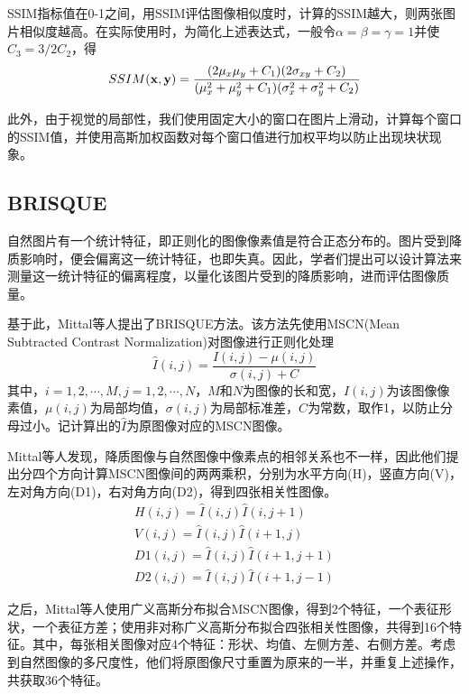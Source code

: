 \documentclass[a4paper, 12pt, oneside]{report}
\begin{document}
{SSIM指标值在0-1之间，用SSIM评估图像相似度时，计算的SSIM越大，则两张图片相似度越高。在实际使用时，为简化上述表达式，一般令$\alpha = \beta = \gamma = 1$并使$C_3 = 3/2 C_2$，得
\begin{equation}
SSIM({\bf x, y}) = \frac{(2\mu_x\mu_y + C_1)(2\sigma_{xy}+ C_2)}{(\mu_x^2 + \mu_y^2 + C_1)(\sigma_x^2 + \sigma_y^2 + C_2)}
\end{equation}

此外，由于视觉的局部性，我们使用固定大小的窗口在图片上滑动，计算每个窗口的SSIM值，并使用高斯加权函数对每个窗口值进行加权平均以防止出现块状现象。

\subsection{BRISQUE\quad}
自然图片有一个统计特征，即正则化的图像像素值是符合正态分布的。图片受到降质影响时，便会偏离这一统计特征，也即失真。因此，学者们提出可以设计算法来测量这一统计特征的偏离程度，以量化该图片受到的降质影响，进而评估图像质量。

基于此，Mittal\cite{ref25}等人提出了BRISQUE方法。该方法先使用MSCN(Mean Subtracted Contrast Normalization)对图像进行正则化处理
\begin{equation} \label{eq:4.11}
\hat{I}(i, j) = \frac{I(i, j) - \mu(i, j)}{\sigma(i, j) + C}
\end{equation}
其中，$i = 1, 2, \cdots, M, j = 1, 2, \cdots, N$，$M$和$N$为图像的长和宽，$I(i, j)$为该图像像素值，$\mu(i, j)$为局部均值，$\sigma(i, j)$为局部标准差，$C$为常数，取作1，以防止分母过小。记计算出的$\hat{I}$为原图像对应的MSCN图像。

Mittal等人发现，降质图像与自然图像中像素点的相邻关系也不一样，因此他们提出分四个方向计算MSCN图像间的两两乘积，分别为水平方向(H)，竖直方向(V)，左对角方向(D1)，右对角方向(D2)，得到四张相关性图像。
\begin{equation} \label{eq:4.12}
\begin{aligned}
H(i, j) = \hat{I}(i, j)\hat{I}(i, j + 1) \\
V(i, j) = \hat{I}(i, j)\hat{I}(i + 1, j) \\
D1(i, j) = \hat{I}(i, j)\hat{I}(i + 1, j + 1) \\
D2(i, j) = \hat{I}(i, j)\hat{I}(i + 1, j - 1) 
\end{aligned}
\end{equation}

之后，Mittal等人使用广义高斯分布拟合MSCN图像，得到2个特征，一个表征形状，一个表征方差；使用非对称广义高斯分布拟合四张相关性图像，共得到16个特征。其中，每张相关图像对应4个特征：形状、均值、左侧方差、右侧方差。考虑到自然图像的多尺度性，他们将原图像尺寸重置为原来的一半，并重复上述操作，共获取36个特征。

}
\end{document}
